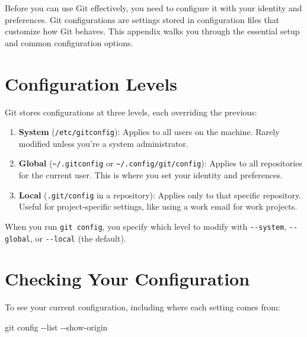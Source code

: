 \documentclass[
  letterpaper,
  DIV=11,
  numbers=noendperiod]{scrreprt}
\newenvironment{Shaded}{\begin{snugshade}}{\end{snugshade}}
\newcommand{\AttributeTok}[1]{\textcolor[rgb]{0.40,0.45,0.13}{#1}}
\newcommand{\FunctionTok}[1]{\textcolor[rgb]{0.28,0.35,0.67}{#1}}
\newcommand{\NormalTok}[1]{\textcolor[rgb]{0.00,0.23,0.31}{#1}}
\begin{document}
Before you can use Git effectively, you need to configure it with your
identity and preferences. Git configurations are settings stored in
configuration files that customize how Git behaves. This appendix walks
you through the essential setup and common configuration options.

\section{Configuration Levels}\label{configuration-levels}

Git stores configurations at three levels, each overriding the previous:

\begin{enumerate}
\def\labelenumi{\arabic{enumi}.}
\item
  \textbf{System} (\texttt{/etc/gitconfig}): Applies to all users on the
  machine. Rarely modified unless you're a system administrator.
\item
  \textbf{Global} (\texttt{\textasciitilde{}/.gitconfig} or
  \texttt{\textasciitilde{}/.config/git/config}): Applies to all
  repositories for the current user. This is where you set your identity
  and preferences.
\item
  \textbf{Local} (\texttt{.git/config} in a repository): Applies only to
  that specific repository. Useful for project-specific settings, like
  using a work email for work projects.
\end{enumerate}

When you run \texttt{git\ config}, you specify which level to modify
with \texttt{-\/-system}, \texttt{-\/-global}, or \texttt{-\/-local}
(the default).

\section{Checking Your Configuration}\label{checking-your-configuration}

To see your current configuration, including where each setting comes
from:

\begin{codelisting}

\caption{\texttt{terminal}}

\begin{Shaded}
\begin{Highlighting}[]
\FunctionTok{git}\NormalTok{ config }\AttributeTok{{-}{-}list} \AttributeTok{{-}{-}show{-}origin}
\end{Highlighting}
\end{Shaded}

\end{codelisting}
\end{document}
